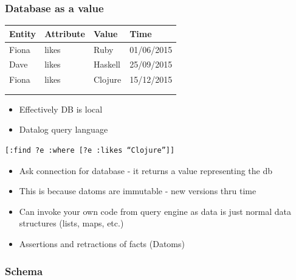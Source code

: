 \documentclass[11pt]{article}
\begin{document}
\subsubsection*{Database as a value}
\label{sec:orgheadline24}

\begin{center}
\begin{tabular}{llll}
Entity & Attribute & Value & Time\\
\hline
Fiona & likes & Ruby & 01/06/2015\\
Dave & likes & Haskell & 25/09/2015\\
Fiona & likes & Clojure & 15/12/2015\\
 &  &  & \\
\hline
 &  &  & \\
\end{tabular}
\end{center}

\begin{itemize}
\item Effectively DB is local
\item Datalog query language
\end{itemize}
\begin{verbatim}
[:find ?e :where [?e :likes “Clojure”]]
\end{verbatim}

\begin{NOTES}
\begin{itemize}
\item Ask connection for database - it returns a value representing the db
\item This is because datoms are immutable - new versions thru time
\item Can invoke your own code from query engine as data is just normal data structures (lists, maps, etc.)
\item Assertions and retractions of facts (Datoms)
\end{itemize}
\end{NOTES}

\subsubsection*{Schema}
\label{sec:orgheadline25}
\end{document}
